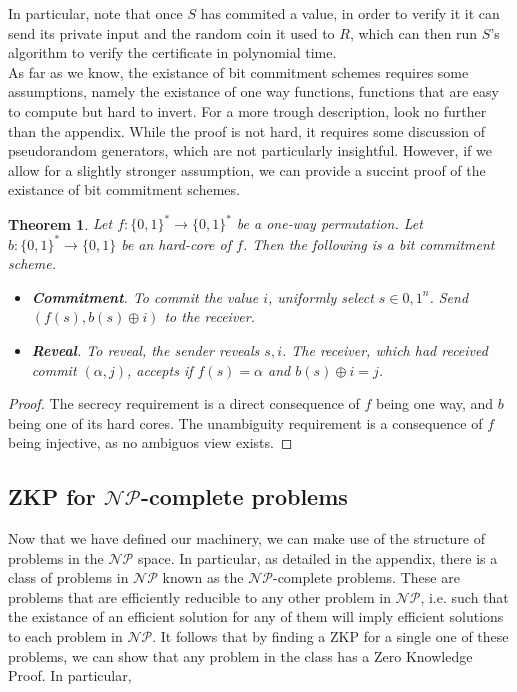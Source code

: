 \documentclass{article}
\newtheorem{theorem}{Theorem}
\begin{document}
In particular, note that once $S$ has commited a value, in order to verify it it can send its private input and the random coin it used to $R$, which can then
run $S$'s algorithm to verify the certificate in polynomial time. \\
As far as we know, the existance of bit commitment schemes requires some assumptions, namely the existance of one way functions, functions that are easy to compute but hard to invert.
For a more trough description, look no further than the appendix. While the proof is not hard, it requires some discussion of pseudorandom generators, which are not particularly insightful.
However, if we allow for a slightly stronger assumption, we can provide a succint proof of the existance of bit commitment schemes.
\begin{theorem}
    Let $f: \{0, 1\}^* \to \{0, 1\}^*$ be a one-way permutation. Let $b: \{0, 1\}^* \to \{0, 1\}$ be an hard-core of $f$. Then the following is a bit commitment scheme.
    \begin{itemize}
        \item \textbf{Commitment}. To commit the value $i$, uniformly select $s \in {0, 1}^n$. Send $(f(s), b(s) \oplus i)$ to the receiver.
        \item \textbf{Reveal}. To reveal, the sender reveals $s, i$. The receiver, which had received commit $(\alpha, j)$, accepts if $f(s) = \alpha$ and $b(s) \oplus i = j$.
    \end{itemize}
\end{theorem}
\begin{proof}
    The secrecy requirement is a direct consequence of $f$ being one way, and $b$ being one of its hard cores.
    The unambiguity requirement is a consequence of $f$ being injective, as no ambiguos view exists.
\end{proof}

\subsection{ZKP for $\mathcal{NP}$-complete problems}
Now that we have defined our machinery, we can make use of the structure of problems in the $\mathcal{NP}$ space.
In particular, as detailed in the appendix, there is a class of problems in $\mathcal{NP}$ known as the $\mathcal{NP}$-complete problems.
These are problems that are efficiently reducible to any other problem in $\mathcal{NP}$, i.e. such that the existance of an efficient solution for any of them will imply efficient solutions to each problem in $\mathcal{NP}$.
It follows that by finding a ZKP for a single one of these problems, we can show that any problem in the class has a Zero Knowledge Proof. 
In particular, 
\end{document}
